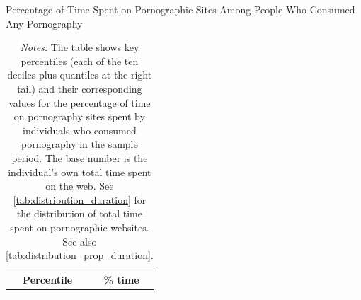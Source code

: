 \documentclass[12pt,twoside]{article}
\begin{document}
\begin{table}[ht] \centering \small \setlength\tabcolsep{10 pt}
	\caption{Percentage of Time Spent on Pornographic Sites Among People Who Consumed Any Pornography}
	\label{tab:distribution_prop_duration_mar}
	\begin{adjustbox}{max width=\textwidth}
		\begin{tabular}{cr}
			\toprule
			\multicolumn{1}{c}{\textbf{Percentile}}&\multicolumn{1}{c}{\textbf{\% time}}\\
			\midrule
			\\
			\bottomrule
		\end{tabular}
	\end{adjustbox}
	\caption*{\footnotesize \emph{Notes:} The table shows key percentiles (each of the ten deciles plus quantiles at the right tail) and their corresponding values for the percentage of time on pornography sites spent by individuals who consumed pornography in the sample period. The base number is the individual's own total time spent on the web. See \cref{tab:distribution_duration} for the distribution of total time spent on pornographic websites.
    See also \cref{tab:distribution_prop_duration}.
 }
\end{table}
\end{document}
